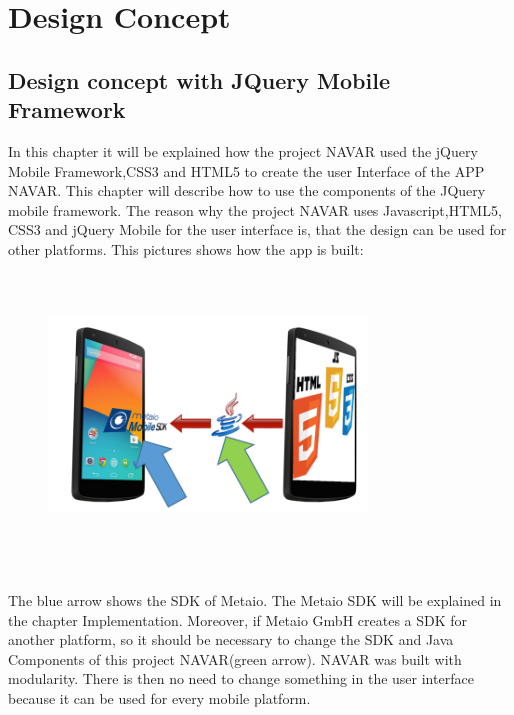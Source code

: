 

\chapter{Design Concept} \label{chapter:desgin}

\section{Design concept with JQuery Mobile Framework}
In this chapter it will be explained how the project NAVAR used the jQuery Mobile Framework,CSS3 and HTML5 to create the user Interface of the APP NAVAR. This chapter will describe how to use  the components of the JQuery mobile framework. The reason why the project NAVAR uses Javascript,HTML5,
CSS3 and jQuery Mobile for the user interface is, that the design can be used for other platforms. This pictures shows how the app is built:
\\\\
\begin{figure}[htbp]
\centering
\includegraphics[width=240pt,height=180pt,keepaspectratio]{graphics/AppStructure.PNG}
\end{figure}
\\\\
The blue arrow shows the SDK of Metaio. The Metaio SDK will be explained in the chapter Implementation. Moreover, if Metaio GmbH creates a SDK for another platform, so it should be necessary to change the SDK and Java Components of this project NAVAR(green arrow). NAVAR was built with modularity. There is then no need to change something in the user interface because it can be used for every mobile platform.
\\\\

